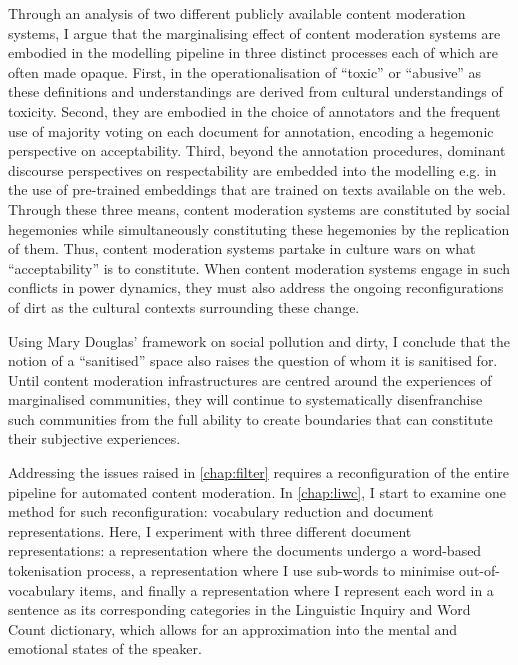 Through an analysis of two different publicly available content moderation systems, I argue that the marginalising effect of content moderation systems are embodied in the modelling pipeline in three distinct processes each of which are often made opaque.
First, in the operationalisation of ``toxic'' or ``abusive'' as these definitions and understandings are derived from cultural understandings of toxicity.
Second, they are embodied in the choice of annotators and the frequent use of majority voting on each document for annotation, encoding a hegemonic perspective on acceptability.
Third, beyond the annotation procedures, dominant discourse perspectives on respectability are embedded into the modelling e.g. in the use of pre-trained embeddings that are trained on texts available on the web.
Through these three means, content moderation systems are constituted by social hegemonies while simultaneously constituting these hegemonies by the replication of them.
Thus, content moderation systems partake in culture wars on what ``acceptability'' is to constitute.
When content moderation systems engage in such conflicts in power dynamics, they must also address the ongoing reconfigurations of dirt as the cultural contexts surrounding these change.

Using Mary Douglas' framework on social pollution and dirty, I conclude that the notion of a ``sanitised'' space also raises the question of whom it is sanitised for.
Until content moderation infrastructures are centred around the experiences of marginalised communities, they will continue to systematically disenfranchise such communities from the full ability to create boundaries that can constitute their subjective experiences.

Addressing the issues raised in \cref{chap:filter} requires a reconfiguration of the entire pipeline for automated content moderation.
In \cref{chap:liwc}, I start to examine one method for such reconfiguration: vocabulary reduction and document representations.
Here, I experiment with three different document representations: a representation where the documents undergo a word-based tokenisation process, a representation where I use sub-words to minimise out-of-vocabulary items, and finally a representation where I represent each word in a sentence as its corresponding categories in the Linguistic Inquiry and Word Count \citep[LIWC,]{Pennebaker:2001} dictionary, which allows for an approximation into the mental and emotional states of the speaker.

